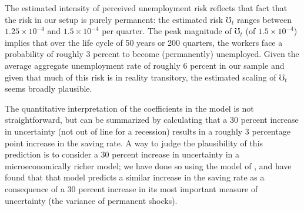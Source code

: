 \documentclass[titlepage]{\econtex}
\begin{document}
The estimated intensity of perceived unemployment risk reflects that fact that the risk in our setup is purely permanent: the estimated risk $\mho_t$ ranges between $1.25\times10^{-4}$ and $1.5\times10^{-4}$ per quarter. The peak magnitude of $\mho_t$ (of $1.5\times10^{-4}$) implies that over the life cycle of 50 years or 200 quarters, the workers face a probability of roughly 3 percent to become (permanently) unemployed. Given the average aggregate unemployment rate of roughly 6 percent in our sample and given that much of this risk is in reality transitory, the estimated scaling of $\mho_t$ seems broadly plausible.


The quantitative interpretation of the coefficients in the model is not straightforward, but can be summarized by calculating  that a 30 percent increase in uncertainty (not out of line for a recession) results in a roughly 3 percentage point increase in the saving rate.  A way to judge the plausibility of this prediction is to consider a 30 percent increase in uncertainty in a microeconomically richer model; we have done so using the model of \cite{cstwMPC}, and have found that that model predicts a similar increase in the saving rate as a consequence of a 30 percent increase in its most important measure of uncertainty (the variance of permanent shocks).
\end{document}
